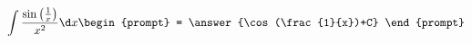\documentclass{ximera}
\author{Steven Gubkin}
\begin{document}
\begin{exercise}


\[
\int \frac{\sin\left(\frac{1}{x}\right)}{x^2} \d x \begin{prompt} = \answer{\cos(\frac{1}{x})+C} \end{prompt}
\]

\end{exercise}
\end{document}
